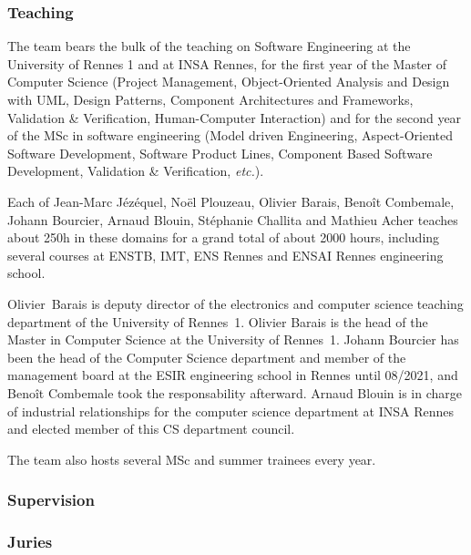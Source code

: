 \subsubsection {Teaching}

 The \team{} team bears the bulk of the teaching on Software Engineering at the 
 University of Rennes 1 and at INSA Rennes, for the first year of the Master of Computer Science
 (Project Management, Object-Oriented Analysis and Design with UML, Design Patterns, 
 Component Architectures and Frameworks, Validation \& Verification, Human-Computer Interaction) 
 and for the second year of the MSc in software engineering (Model driven Engineering, Aspect-Oriented Software Development, 
 Software Product Lines, Component Based Software Development, Validation \& Verification, \textit{etc.}). 
 
 Each of Jean-Marc J\'{e}z\'{e}quel, No\"el Plouzeau, Olivier Barais, Benoît Combemale, Johann Bourcier, Arnaud Blouin, Stéphanie Challita and Mathieu Acher teaches about 250h in these domains for a grand total of about 2000 hours, including several courses at ENSTB, IMT, ENS Rennes and ENSAI Rennes engineering school.
 
Olivier~Barais is deputy director of the electronics and computer science teaching department of the University of Rennes~1.
Olivier Barais is the head of the Master in Computer Science at the University of Rennes~1.
Johann Bourcier has been the head of the Computer Science department and member of the management board at the ESIR engineering school in Rennes until 08/2021, and Benoît Combemale took the responsability afterward.
Arnaud Blouin is in charge of industrial relationships for the computer science department at INSA Rennes and elected member of this CS department council.
 
 The \team{} team also hosts several MSc and summer trainees every year.
 




\subsubsection{Supervision}
\label{DIVERSE:teaching-supervision}

\subsubsection{Juries}
\label{DIVERSE:teaching-juries}

